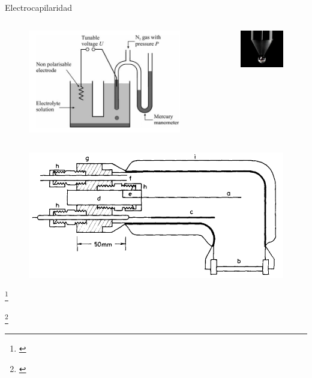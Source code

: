 \documentclass[handout]{beamer}
\newcommand\blfootnote[1]
{%
	\begingroup
	\renewcommand\thefootnote{}\footnote{#1}%
	\addtocounter{footnote}{-1}%
	\endgroup
}
\newcommand{\fcite}[1]{\blfootnote{\cite{#1}}}
\begin{document}
\begin{frame}{Electrocapilaridad}
	\begin{columns}
		\begin{column}{0.6\textwidth}
			\begin{figure}[h]
				\centering
				\includegraphics[width=0.7\linewidth]{sources/electro}
			\end{figure}
		\end{column}
		\begin{column}{0.4\textwidth}
			\begin{figure}[h]
				\centering
				\includegraphics[width=0.7\linewidth]{sources/dropping}
			\end{figure}
		\end{column}
	\end{columns}
	\begin{figure}[h]
		\centering
		\includegraphics[width=0.5\linewidth]{sources/solidElectro}
	\end{figure}
	\fcite{butt2006physics}
	\fcite{fredlein1974electrocapillary}
\end{frame}
\end{document}
